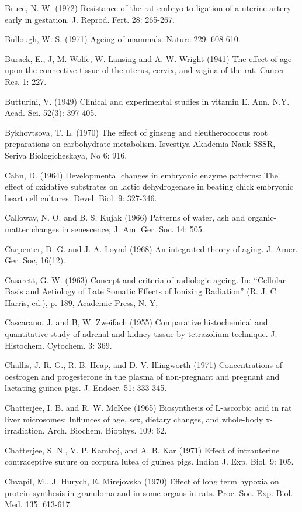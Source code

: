 Bruce, N. W. (1972) Resistance of the rat embryo to ligation of a uterine artery early in gestation. J. Reprod. Fert. 28: 265-267.

Bullough, W. S. (1971) Ageing of mammals. Nature 229: 608-610.

Burack, E., J, M. Wolfe, W. Lansing and A. W. Wright (1941) The effect of age upon the connective tissue of the uterus, cervix, and vagina of the rat. Cancer Res. 1: 227.

Butturini, V. (1949) Clinical and experimental studies in vitamin E. Ann. N.Y. Acad. Sci. 52(3): 397-405.

Bykhovtsova, T. L. (1970) The effect of ginseng and eleutherococcus root preparations on carbohydrate metabolism. Isvestiya Akademia Nauk SSSR, Seriya Biologicheskaya, No 6: 916.

Cahn, D. (1964) Developmental changes in embryonic enzyme patterns: The effect of oxidative substrates on lactic dehydrogenase in beating chick embryonic heart cell cultures. Devel. Biol. 9: 327-346.

Calloway, N. O. and B. S. Kujak (1966) Patterns of water, ash and organic-matter changes in senescence, J. Am. Ger. Soc. 14: 505.

Carpenter, D. G. and J. A. Loynd (1968) An integrated theory of aging. J. Amer. Ger. Soc, 16(12).

Casarett, G. W. (1963) Concept and criteria of radiologic ageing. In: ``Cellular Basis and Aetiology of Late Somatic Effects of Ionizing Radiation'' (R. J. C. Harris, ed.), p. 189, Academic Press, N. Y,

Cascarano, J. and B, W. Zweifach (1955) Comparative histochemical and quantitative study of adrenal and kidney tissue by tetrazolium technique. J. Histochem. Cytochem. 3: 369.

Challis, J. R. G., R. B. Heap, and D. V. Illingworth (1971) Concentrations of oestrogen and progesterone in the plasma of non-pregnant and pregnant and lactating guinea-pigs. J. Endocr. 51: 333-345.

Chatterjee, I. B. and R. W. McKee (1965) Biosynthesis of L-ascorbic acid in rat liver microsomes: Influnces of age, sex, dietary changes, and whole-body x-irradiation. Arch. Biochem. Biophys. 109: 62.

Chatterjee, S. N., V. P. Kamboj, and A. B. Kar (1971) Effect of intrauterine contraceptive suture on corpura lutea of guinea pigs. Indian J. Exp. Biol. 9: 105.

Chvapil, M., J. Hurych, E, Mirejovska (1970) Effect of long term hypoxia on protein synthesis in granuloma and in some organs in rats. Proc. Soc. Exp. Biol. Med. 135: 613-617.


